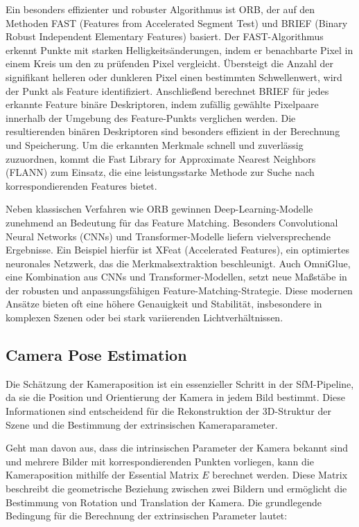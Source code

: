 Ein besonders effizienter und robuster Algorithmus ist ORB, der auf den Methoden FAST (Features from Accelerated Segment Test) und BRIEF (Binary Robust Independent Elementary Features) basiert. Der FAST-Algorithmus erkennt Punkte mit starken Helligkeitsänderungen, indem er benachbarte Pixel in einem Kreis um den zu prüfenden Pixel vergleicht. Übersteigt die Anzahl der signifikant helleren oder dunkleren Pixel einen bestimmten Schwellenwert, wird der Punkt als Feature identifiziert. Anschließend berechnet BRIEF für jedes erkannte Feature binäre Deskriptoren, indem zufällig gewählte Pixelpaare innerhalb der Umgebung des Feature-Punkts verglichen werden. Die resultierenden binären Deskriptoren sind besonders effizient in der Berechnung und Speicherung. Um die erkannten Merkmale schnell und zuverlässig zuzuordnen, kommt die Fast Library for Approximate Nearest Neighbors (FLANN) zum Einsatz, die eine leistungsstarke Methode zur Suche nach korrespondierenden Features bietet.

Neben klassischen Verfahren wie ORB gewinnen Deep-Learning-Modelle zunehmend an Bedeutung für das Feature Matching. Besonders Convolutional Neural Networks (CNNs) und Transformer-Modelle liefern vielversprechende Ergebnisse. Ein Beispiel hierfür ist XFeat (Accelerated Features), ein optimiertes neuronales Netzwerk, das die Merkmalsextraktion beschleunigt. Auch OmniGlue, eine Kombination aus CNNs und Transformer-Modellen, setzt neue Maßstäbe in der robusten und anpassungsfähigen Feature-Matching-Strategie. Diese modernen Ansätze bieten oft eine höhere Genauigkeit und Stabilität, insbesondere in komplexen Szenen oder bei stark variierenden Lichtverhältnissen.

\subsection{Camera Pose Estimation}

Die Schätzung der Kameraposition ist ein essenzieller Schritt in der SfM-Pipeline, da sie die Position und Orientierung der Kamera in jedem Bild bestimmt. Diese Informationen sind entscheidend für die Rekonstruktion der 3D-Struktur der Szene und die Bestimmung der extrinsischen Kameraparameter.

Geht man davon aus, dass die intrinsischen Parameter der Kamera bekannt sind und mehrere Bilder mit korrespondierenden Punkten vorliegen, kann die Kameraposition mithilfe der Essential Matrix \(E\) berechnet werden. Diese Matrix beschreibt die geometrische Beziehung zwischen zwei Bildern und ermöglicht die Bestimmung von Rotation und Translation der Kamera. Die grundlegende Bedingung für die Berechnung der extrinsischen Parameter lautet:

